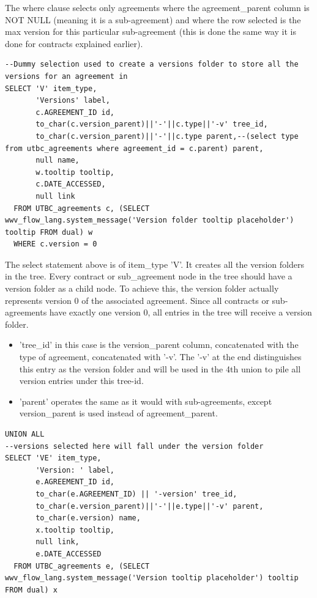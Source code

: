 \documentclass{report}
\begin{document}
The where clause selects only agreements where the agreement\_parent column is NOT NULL (meaning it is a sub-agreement) and where the row selected is the max version for this particular sub-agreement (this is done the same way it is done for contracts explained earlier).
\begin{lstlisting}[caption=Select statement creating a dummy version folder entry in the tree.]
--Dummy selection used to create a versions folder to store all the versions for an agreement in
SELECT 'V' item_type,
       'Versions' label,
       c.AGREEMENT_ID id,
       to_char(c.version_parent)||'-'||c.type||'-v' tree_id,
       to_char(c.version_parent)||'-'||c.type parent,--(select type from utbc_agreements where agreement_id = c.parent) parent,
       null name,
       w.tooltip tooltip,
       c.DATE_ACCESSED,
       null link
  FROM UTBC_agreements c, (SELECT wwv_flow_lang.system_message('Version folder tooltip placeholder') tooltip FROM dual) w
  WHERE c.version = 0
\end{lstlisting}
The select statement above is of item\_type 'V'.  It creates all the version folders in the tree.  Every contract or sub\_agreement node in the tree should have a version folder as a child node.  To achieve this, the version folder actually represents version 0 of the associated agreement.  Since all contracts or sub-agreements have exactly one version 0, all entries in the tree will receive a version folder.
\begin{itemize}
	\item 'tree\_id' in this case is the version\_parent column, concatenated with the type of agreement, concatenated with '-v'.  The '-v' at the end distinguishes this entry as the version folder and will be used in the 4th union to pile all version entries under this tree-id.
	\item 'parent' operates the same as it would with sub-agreements, except version\_parent is used instead of agreement\_parent.
\end{itemize}
\begin{lstlisting}[caption=Select statement getting all versions for a particular contract and making them children of the version folder.]
UNION ALL
--versions selected here will fall under the version folder
SELECT 'VE' item_type,
       'Version: ' label,
       e.AGREEMENT_ID id,
       to_char(e.AGREEMENT_ID) || '-version' tree_id,
       to_char(e.version_parent)||'-'||e.type||'-v' parent,
       to_char(e.version) name,
       x.tooltip tooltip,
       null link,
       e.DATE_ACCESSED
  FROM UTBC_agreements e, (SELECT wwv_flow_lang.system_message('Version tooltip placeholder') tooltip FROM dual) x
\end{lstlisting}
\end{document}
